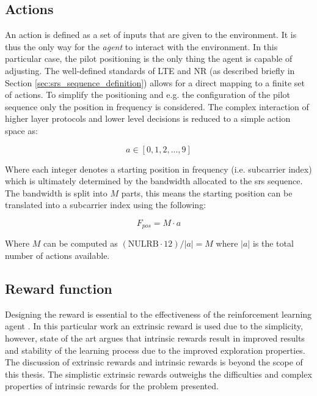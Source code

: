 \subsection{Actions}
An action is defined as a set of inputs that are given to the environment. It is thus the only way for the \emph{agent} to interact with the environment. In this particular case, the pilot positioning is the only thing the agent is capable of adjusting. The well-defined standards of LTE and NR (as described briefly in Section \ref{sec:srs_sequence_definition}) allows for a direct mapping to a finite set of actions. To simplify the positioning and e.g. the configuration of the pilot sequence only the position in frequency is considered. The complex interaction of higher layer protocols and lower level decisions is reduced to a simple action space as:

\begin{equation}
   a \in [0, 1, 2, ..., 9]
\end{equation}

Where each integer denotes a starting position in frequency (i.e. subcarrier index) which is ultimately determined by the bandwidth allocated to the \gls{srs} sequence. The bandwidth is split into $M$ parts, this means the starting position can be translated into a subcarrier index using the following:

\begin{equation}
    F_{pos} = M \cdot a
\end{equation}

Where $M$ can be computed as $(\text{NULRB} \cdot 12) / |a| = M$ where $|a|$ is the total number of actions available. 

\subsection{Reward function}

Designing the reward is essential to the effectiveness of the reinforcement learning agent \cite{Sutton2017ReinforcementSecond}. In this particular work an extrinsic reward is used due to the simplicity, however, state of the art argues that intrinsic rewards result in improved results and stability of the learning process \cite{SinghIntrinsicallyLearning} due to the improved exploration properties. The discussion of extrinsic rewards and intrinsic rewards is beyond the scope of this thesis. The simplistic extrinsic rewards outweighs the difficulties and complex properties of intrinsic rewards for the problem presented. 

